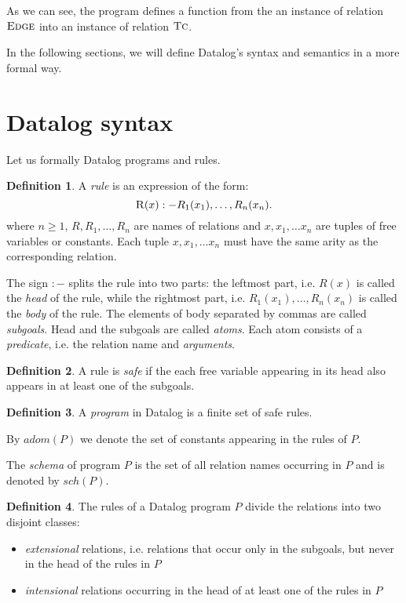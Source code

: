 \documentclass{pracamgr}
\theoremstyle{plain}
\theoremstyle{definition}
\newtheorem{defn}{Definition}[section]
\theoremstyle{remark}
\begin{document}
As we can see, the program defines a function from the an instance of relation $\textsc{Edge}$ into an instance of relation $\textsc{Tc}$.

In the following sections, we will define Datalog's syntax and semantics in a more formal way.

\section{Datalog syntax}
Let us formally Datalog programs and rules.

\begin{defn}
A \emph{rule} is an expression of the form:
$$ \textsc{R}(x) :- R_1(x_1), \dots, R_n(x_n). $$
where $n \ge 1$, $R, R_1, \dots, R_n$ are names of relations and $x, x_1, \dots x_n$ are tuples of free variables or constants. Each tuple $x, x_1, \dots x_n$ must have the same arity as the corresponding relation.
\end{defn}\label{d:datalogrule}

The sign $:-$ splits the rule into two parts: the leftmost part, i.e. $R(x)$ is called the \emph{head} of the rule, while the rightmost part, i.e. $R_1(x_1), \dots, R_n(x_n)$ is called the \emph{body} of the rule. The elements of body separated by commas are called \emph{subgoals}. Head and the subgoals are called \emph{atoms}. Each atom consists of a \emph{predicate}, i.e. the relation name and \emph{arguments}.

\begin{defn}
A rule is \emph{safe} if the each free variable appearing in its head also appears in at least one of the subgoals.
\end{defn}\label{d:datalogsaferule}

\begin{defn}
A \emph{program} in Datalog is a finite set of safe rules.
\end{defn}\label{d:datalogprog}

By $adom(P)$ we denote the set of constants appearing in the rules of $P$.

The \emph{schema} of program $P$ is the set of all relation names occurring in $P$ and is denoted by $sch(P)$.

\begin{defn}
The rules of a Datalog program $P$ divide the relations into two disjoint classes: 
\begin{itemize}
\item \emph{extensional} relations, i.e. relations that occur only in the subgoals, but never in the head of the rules in $P$
\item \emph{intensional} relations occurring in the head of at least one of the rules in $P$
\end{itemize}
\end{defn}
\end{document}

